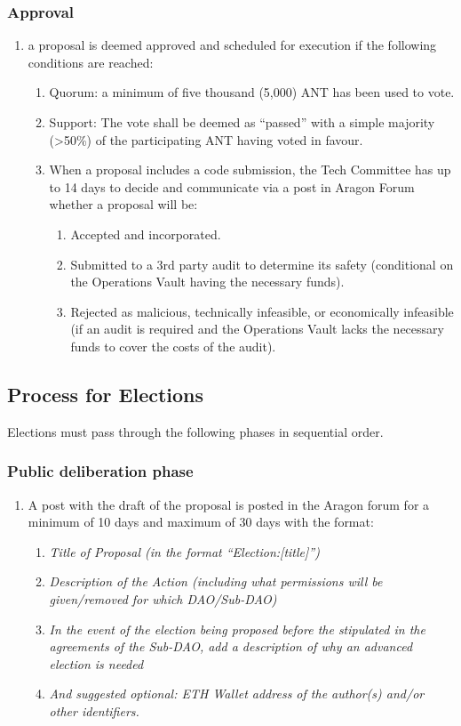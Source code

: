 \subsubsection*{Approval} 
\begin{enumerate}
	\item a proposal is deemed approved and scheduled for execution if the following conditions are reached:
	\begin{enumerate}
		\item Quorum: a minimum of five thousand (5,000) \ac{ANT} has been used to vote.
		\item  Support: The vote shall be deemed as “passed” with a simple majority (>50\%) of the participating \ac{ANT} having voted in favour.
		\item When a proposal includes a code submission, the Tech Committee has up to 14 days to decide and communicate via a post in Aragon Forum whether a proposal will be:
		\begin{enumerate}
			\item Accepted and incorporated.
			\item Submitted to a 3rd party audit to determine its safety (conditional on the Operations Vault having the necessary funds).
			\item Rejected as malicious, technically infeasible, or economically infeasible (if an audit is required and the Operations Vault lacks the necessary funds to cover the costs of the audit).
		\end{enumerate}
	\end{enumerate}
\end{enumerate}


\subsection{Process for Elections}

Elections must pass through the following phases in sequential order.

\subsubsection*{Public deliberation phase} 

\begin{enumerate}
	\item A post with the draft of the proposal is posted in the Aragon forum for a minimum of 10 days and maximum of 30 days with the format:
	\begin{enumerate}
		\item \textit{Title of Proposal (in the format “Election:[title]”)}
		\item \textit{Description of the Action (including what permissions will be given/removed for which \ac{DAO}/Sub-\ac{DAO})}
		\item \textit{In the event of the election being proposed before the stipulated in the agreements of the Sub-\ac{DAO}, add a description of why an advanced election is needed}
		\item \textit{And suggested optional: ETH Wallet address of the author(s) and/or other identifiers.}
	\end{enumerate}
\end{enumerate}

